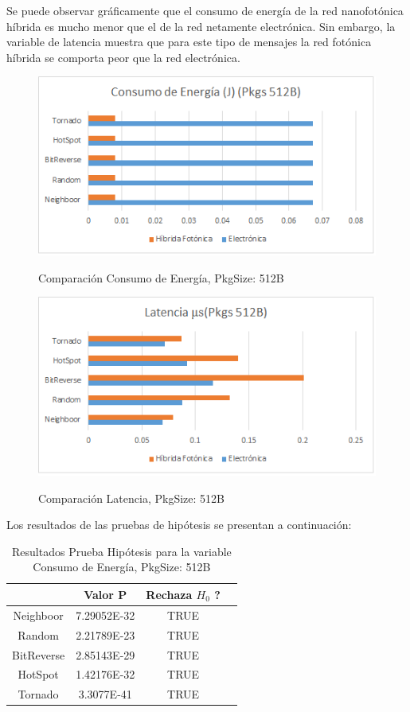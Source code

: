 Se puede observar gráficamente que el consumo de energía de la red
nanofotónica híbrida es mucho menor que el de la red netamente electrónica.
Sin embargo, la variable de latencia muestra que para este tipo de mensajes
la red fotónica híbrida se comporta peor que la red electrónica.

\begin{figure}[H]
\caption{Comparación Consumo de Energía, PkgSize: 512B}
\centering
\includegraphics[width=1.0\textwidth,natwidth=483,natheight=256]{figs/E512.png}
\label{fig:e512}
\end{figure} 

\begin{figure}[H]
\caption{Comparación Latencia, PkgSize: 512B}
\centering
\includegraphics[width=1.0\textwidth,natwidth=483,natheight=256]{figs/L512.png}
\label{fig:l512}
\end{figure} 

Los resultados de las pruebas de hipótesis se presentan a continuación:
 
\begin{table}[H]
\centering
\begin{tabular}{|c|c|c|c|}
\hline
&Valor P&Rechaza $H_0$ ?\\
\hline
Neighboor&7.29052E-32&TRUE\\
Random&2.21789E-23&TRUE\\
BitReverse&2.85143E-29&TRUE\\
HotSpot&1.42176E-32&TRUE\\
Tornado&3.3077E-41&TRUE\\
\hline
\end{tabular}
\caption{Resultados Prueba Hipótesis para la variable Consumo de Energía, PkgSize: 512B}
\label{tb:ettest512}
\end{table}

